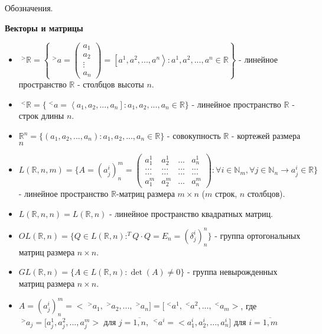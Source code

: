 \documentclass[__main__.tex]{subfiles}
\begin{document}
Обозначения.

\textbf{Векторы и матрицы}

\begin{itemize}
    \item
          $\;^{>}\mathbb{R} = \left\{ \;^{>}a =
              \left(
              \begin{matrix}
                      a_1    \\
                      a_2    \\
                      \vdots \\
                      a_n
                  \end{matrix}
              \right)
              = \left[a^1,a^2, ... ,a^n\right> : a^1, a^2, ... , a^n \in \mathbb{R}
              \right\}$ - линейное пространство $\mathbb{R}$ - столбцов высоты $n$.

    \item
          $\;^{<}\mathbb{R} = \lbrace \;^{<}a = \left< a_1,a_2, ... , a_n \right] : a_1, a_2, ... , a_n \in \mathbb{R}
              \rbrace$ - линейное пространство $\mathbb{R}$ - строк длины $n$.

    \item
          $\mathbb{R}^n = \lbrace (a_1, a_2, ... , a_n): a_1, a_2, ... , a_n \in \mathbb{R} \rbrace$ - совокупность $\mathbb{R}$ - кортежей размера $n$

    \item
          $L(\mathbb{R}, n, m) = \lbrace A = (a^i_j)^m_n = \left(
              \begin{matrix}
                      a^1_1 & a^1_2 & ... & a^1_n \\
                      ...   & ...   & ... & ...   \\
                      ...   & ...   & ... & ...   \\
                      a^m_1 & a^m_2 & ... & a^m_n
                  \end{matrix}
              \right): \forall i \in \mathbb{N}_m, \forall j \in \mathbb{N}_n \rightarrow a_j^i \in \mathbb{R} \rbrace$ - линейное пространство $\mathbb{R}$-матриц размера $m \times n$ ($m$ строк, $n$ столбцов).

    \item
          $L (\mathbb{R},n,n) = L (\mathbb{R},n)$ - линейное пространство квадратных матриц.

    \item
          $OL(\mathbb{R},n) = \lbrace Q \in L(\mathbb{R},n): ^{T}Q \cdot Q = E_n = (\delta ^i_j)^n_n \rbrace$ - группа ортогональных матриц размера $n \times n$.

    \item
          $GL(\mathbb{R},n) = \lbrace A \in L(\mathbb{R},n): \det (A) \neq 0 \rbrace$ - группа невырожденных матриц размера $n \times n$.

    \item
          $A = (a^i_j)^m_n = < \;^{>}a_1, \;^{>}a_2, ... , \;^{>}a_n] = [\;^{<}a^1, \;^{<}a^2, ... , \;^{<}a_m >$, где $\;^{>}a_j = [a^1_j, a^2_j, ... , a^m_j >$ для $j = \overline{1,n}$, $\;^{<}a^i = < a^i_1, a^i_2, ... , a^i_n]$ для $i = \overline{1,m}$
\end{itemize}
\end{document}
